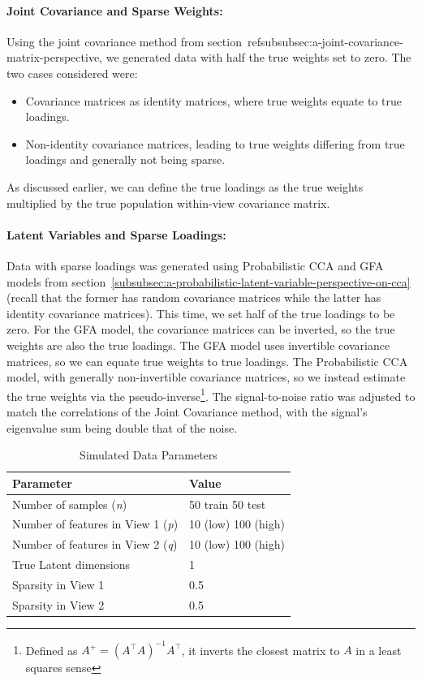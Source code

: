 \paragraph{Joint Covariance and Sparse Weights:} Using the joint covariance method from section~ref{subsubsec:a-joint-covariance-matrix-perspective}, we generated data with half the true weights set to zero.
The two cases considered were:

\begin{itemize}
    \item Covariance matrices as identity matrices, where true weights equate to true loadings.
    \item Non-identity covariance matrices, leading to true weights differing from true loadings and generally not being sparse.
\end{itemize}

As discussed earlier, we can define the true loadings as the true weights multiplied by the true population within-view covariance matrix.

\paragraph{Latent Variables and Sparse Loadings:} Data with sparse loadings was generated using Probabilistic CCA and GFA models from section~\ref{subsubsec:a-probabilistic-latent-variable-perspective-on-cca}(recall that the former has random covariance matrices while the latter has identity covariance matrices).
This time, we set half of the true loadings to be zero.
For the GFA model, the covariance matrices can be inverted, so the true weights are also the true loadings.
The GFA model uses invertible covariance matrices, so we can equate true weights to true loadings.
The Probabilistic CCA model, with generally non-invertible covariance matrices, so we instead estimate the true weights via the pseudo-inverse\footnote{Defined as $A^+ = (A^\top A)^{-1} A^\top$, it inverts the closest matrix to $A$ in a least squares sense}.
The signal-to-noise ratio was adjusted to match the correlations of the Joint Covariance method, with the signal's eigenvalue sum being double that of the noise.

\begin{table}
\centering
\caption{Simulated Data Parameters}
\begin{tabular}{| l | l |}
\hline
\textbf{Parameter} & \textbf{Value} \\
\hline
Number of samples (\textit{n}) & 50 train 50 test \\
Number of features in View 1 (\textit{p}) & 10 (low) 100 (high) \\
Number of features in View 2 (\textit{q}) & 10 (low) 100 (high) \\
True Latent dimensions & 1 \\
Sparsity in View 1 & 0.5 \\
Sparsity in View 2 & 0.5 \\
\hline
\end{tabular}\label{table:simulated-data-parameters}
\end{table}

